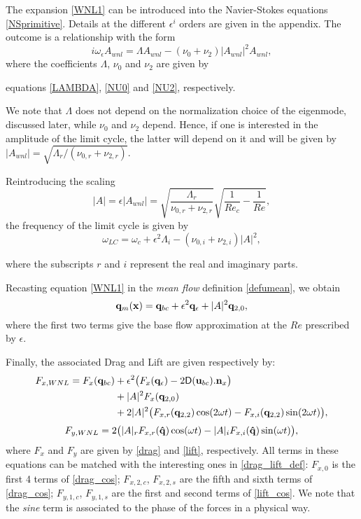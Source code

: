 \documentclass[twocolumn,10pt]{asme2ej}
\newcommand{\be}[1]{ \begin{equation} \label{#1}}
\newcommand{\ee}{\end{equation}}
\begin{document}
{\color{red}
The expansion \ref{WNL1} can be introduced into the Navier-Stokes equations \ref{NSprimitive}. Details at the different $\epsilon^i$ orders are given in the appendix}. The outcome is a relationship with the form
\be{WNL3}
i \omega_\epsilon A_{wnl} = \Lambda A_{wnl} - (\nu_0+\nu_2)  |A_{wnl}|^2 A_{wnl},
\ee
where the coefficients $\Lambda$, $\nu_0$ and $\nu_2$ are given by {\color{red}equations \ref{LAMBDA}, \ref{NU0} and \ref{NU2}, respectively.

We note that $\Lambda$ does not depend on the normalization choice of the eigenmode, discussed later, while $\nu_0$ and $\nu_2$ depend. Hence, if one is interested in the amplitude of the limit cycle, the latter will depend on it and will be given by $|A_{wnl}| = \sqrt{\Lambda_r/(\nu_{0,r}+\nu_{2,r})}$.

Reintroducing the scaling
\be{ANL} 
|A| =  \epsilon |A_{wnl}| =\sqrt{ \frac{\Lambda_r}{\nu_{0,r}+\nu_{2,r} }} \sqrt{\frac{1}{Re_c}-\frac{1}{Re}},
\ee
the frequency of the limit cycle is given by
\be{omegaWNL} 
\omega_{LC}=\omega_c+ \epsilon^2\Lambda_i- (\nu_{0,i}+\nu_{2,i})|A|^2,
\ee 

where the subscripts $r$ and $i$ represent the real and imaginary parts.
}
{\color{red}
Recasting equation \ref{WNL1} in the {\em mean flow} definition \ref{defumean}, we obtain
\be{mean_flow_WNL}
{\bf q}_m({\bf x })= {\bf q}_{bc}+\epsilon^2 {\bf q}_\epsilon + |A|^2{\bf q}_{2,0},
\ee
where the first two terms give the base flow approximation at the $Re$ prescribed by $\epsilon$. }

{\color{red} Finally, the associated Drag and Lift are given respectively by:
\be{drag_cos}
\begin{aligned}
F_{x,WNL} = F_{x}({\bf q}_{bc})&+\epsilon^2 \big( 
F_{x}({\bf q}_{\epsilon})- 2\mathsf{D}({\bf u}_{bc}).{\bf n}_x \big)\\
&+|A|^2 F_{x}({\bf q}_{2,0})\\
&+2|A|^2\big(F_{x,r}({\bf q}_{2,2})\cos(2\omega t)
-F_{x,i}({\bf q}_{2,2})\sin(2\omega t) \big),
\end{aligned}
\ee
\be{lift_cos}
\begin{aligned}
F_{y,WNL} =2\big(|A|_r F_{x,r}({\bf \hat{q}})\cos(\omega t)-
|A|_i F_{x,i}({\bf \hat{q}})\sin(\omega t) \big),\\
\end{aligned}
\ee
where $F_{x}$ and $F_{y}$ are given by \ref{drag} and \ref{lift}, respectively. All terms in these equations can be matched with the interesting ones in \ref{drag_lift_def}: $F_{x,0}$ is the first 4 terms of \ref{drag_cos}; $F_{x,2,c}$, $F_{x,2,s}$ are the fifth and sixth terms of \ref{drag_cos}; $F_{y,1,c}$, $F_{y,1,s}$ are the first and second terms of \ref{lift_cos}. We note that the \textit{sine} term is associated to the phase of the forces in a physical way. }
\end{document}
